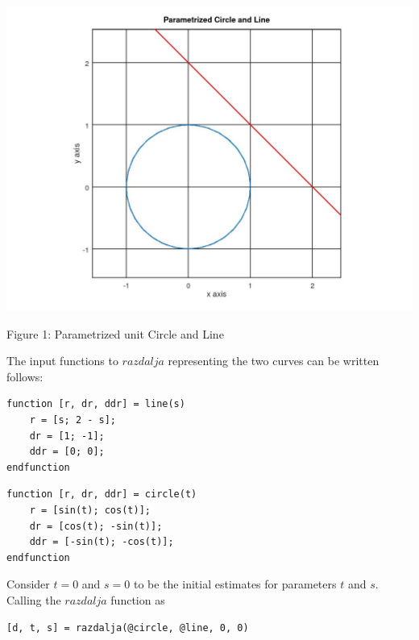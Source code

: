 \documentclass[A4]{article}
\begin{document}
\includegraphics[scale=0.5, inner]{1}

\begin{center}
\caption{Figure 1: Parametrized unit Circle and Line}
\end{center}

\vspace{7mm}
The input functions to $razdalja$ representing the two curves can be written follows:

\begin{tcolorbox}
	\begin{small}
	\begin{verbatim}
function [r, dr, ddr] = line(s)
    r = [s; 2 - s];
    dr = [1; -1];
    ddr = [0; 0];
endfunction
	\end{verbatim}
	\end{small}
\end{tcolorbox}

\begin{tcolorbox}
	\begin{small}
	\begin{verbatim}
function [r, dr, ddr] = circle(t)
    r = [sin(t); cos(t)];
    dr = [cos(t); -sin(t)];
    ddr = [-sin(t); -cos(t)];
endfunction
	\end{verbatim}
	\end{small}
\end{tcolorbox}

Consider $t=0$ and $s=0$ to be the initial estimates for parameters $t$ and $s$.
Calling the $razdalja$ function as

\begin{tcolorbox}
	\begin{small}
	\begin{verbatim}
[d, t, s] = razdalja(@circle, @line, 0, 0)
	\end{verbatim}
	\end{small}
\end{tcolorbox}
\end{document}
